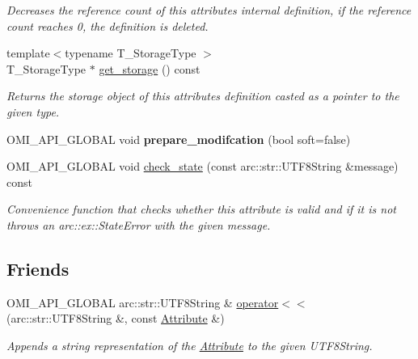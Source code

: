 \begin{DoxyCompactItemize}
\begin{DoxyCompactList}\small\item\em Decreases the reference count of this attribute\textquotesingle{}s internal definition, if the reference count reaches 0, the definition is deleted. \end{DoxyCompactList}\item 
{\footnotesize template$<$typename T\+\_\+\+Storage\+Type $>$ }\\T\+\_\+\+Storage\+Type $\ast$ \hyperlink{classomi_1_1_attribute_aa3371ea331f0b313dce3d9b117775ff8}{get\+\_\+storage} () const \hypertarget{classomi_1_1_attribute_aa3371ea331f0b313dce3d9b117775ff8}{}\label{classomi_1_1_attribute_aa3371ea331f0b313dce3d9b117775ff8}

\begin{DoxyCompactList}\small\item\em Returns the storage object of this attribute\textquotesingle{}s definition casted as a pointer to the given type. \end{DoxyCompactList}\item 
O\+M\+I\+\_\+\+A\+P\+I\+\_\+\+G\+L\+O\+B\+AL void {\bfseries prepare\+\_\+modifcation} (bool soft=false)\hypertarget{classomi_1_1_attribute_a37bbc9dd7aa5b5eca9be1b9d83d2a268}{}\label{classomi_1_1_attribute_a37bbc9dd7aa5b5eca9be1b9d83d2a268}

\item 
O\+M\+I\+\_\+\+A\+P\+I\+\_\+\+G\+L\+O\+B\+AL void \hyperlink{classomi_1_1_attribute_a08ee8d47ce7b971daf3906555a8cd536}{check\+\_\+state} (const arc\+::str\+::\+U\+T\+F8\+String \&message) const \hypertarget{classomi_1_1_attribute_a08ee8d47ce7b971daf3906555a8cd536}{}\label{classomi_1_1_attribute_a08ee8d47ce7b971daf3906555a8cd536}

\begin{DoxyCompactList}\small\item\em Convenience function that checks whether this attribute is valid and if it is not throws an arc\+::ex\+::\+State\+Error with the given message. \end{DoxyCompactList}\end{DoxyCompactItemize}
\subsection*{Friends}
\begin{DoxyCompactItemize}
\item 
O\+M\+I\+\_\+\+A\+P\+I\+\_\+\+G\+L\+O\+B\+AL arc\+::str\+::\+U\+T\+F8\+String \& \hyperlink{classomi_1_1_attribute_aab6bf26917cd74f870e8db73210c6063}{operator$<$$<$} (arc\+::str\+::\+U\+T\+F8\+String \&, const \hyperlink{classomi_1_1_attribute}{Attribute} \&)\hypertarget{classomi_1_1_attribute_aab6bf26917cd74f870e8db73210c6063}{}\label{classomi_1_1_attribute_aab6bf26917cd74f870e8db73210c6063}

\begin{DoxyCompactList}\small\item\em Appends a string representation of the \hyperlink{classomi_1_1_attribute}{Attribute} to the given U\+T\+F8\+String. \end{DoxyCompactList}\end{DoxyCompactItemize}


